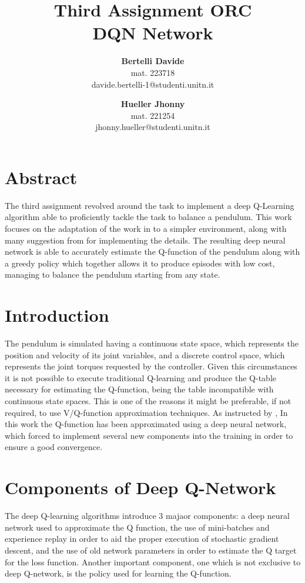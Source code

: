 \documentclass[twocolumn, a4paper]{article}
\begin{document}
\title{
	   \LARGE\textbf{Third Assignment ORC\\DQN Network}
	   \vspace{1cm}
	  }
\author{
		\textbf{Bertelli Davide} \\
		mat. 223718 \\
		davide.bertelli-1@studenti.unitn.it
		\and
		\textbf{Hueller Jhonny} \\
		mat. 221254\\
		jhonny.hueller@studenti.unitn.it
	   }
\date{}
\maketitle

\section{Abstract}
The third assignment revolved around the task to implement a deep Q-Learning
algorithm able to proficiently tackle the task to balance a pendulum.
This work focuses on the adaptation of the work in \cite{Mnih} to a simpler
environment, along with many suggestion from \cite{Roderick} for
implementing the details.
The resulting deep neural network is able to accurately estimate the Q-function
of the pendulum along with a greedy policy which together allows it to produce 
episodes with low cost, managing to balance the pendulum starting from any state.

\section{Introduction}
The pendulum is simulated having a continuous state space, which represents
the position and velocity of its joint variables, and a discrete control
space, which represents the joint torques requested by the controller.
Given this circumstances it is not possible to execute traditional Q-learning
and produce the Q-table necessary for estimating the Q-function, being the table
incompatible with continuous state spaces.
This is one of the reasons it might be preferable, if not required, to use
V/Q-function approximation techniques.
As instructed by \cite{Roderick}, In this work the Q-function has been
approximated using a deep neural network, which forced to implement several
new components into the training in order to ensure a good convergence.

\section{Components of Deep Q-Network}
The deep Q-learning algorithms introduce 3 majaor components: a deep neural
network used to approximate the Q function, the use of mini-batches and
experience replay in order to aid the proper execution of stochastic gradient
descent, and the use of old network parameters in order to estimate the Q
target for the loss function\cite{Roderick}. Another important component,
one which is not exclusive to deep Q-network, is the policy used for learning
the Q-function.
\end{document}
